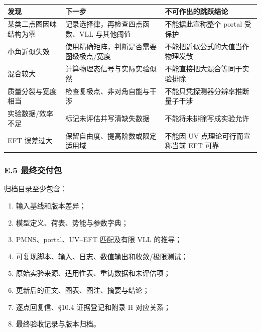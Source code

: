 \documentclass[
  chinese,
  UTF8]{ctexart}
\newcounter{none} %
\providecommand{\tightlist}{%
  \setlength{\itemsep}{0pt}\setlength{\parskip}{0pt}}
\begin{document}
{\def\LTcaptype{none} %
\begin{longtable}[]{@{}
  >{\raggedright\arraybackslash}p{}
  >{\raggedright\arraybackslash}p{}
  >{\raggedright\arraybackslash}p{}@{}}
\toprule\noalign{}
\begin{minipage}[b]{\linewidth}\raggedright
发现
\end{minipage} & \begin{minipage}[b]{\linewidth}\raggedright
下一步
\end{minipage} & \begin{minipage}[b]{\linewidth}\raggedright
不可作出的跳跃结论
\end{minipage} \\
\midrule\noalign{}
\endhead
\bottomrule\noalign{}
\endlastfoot
某类二点图因味结构为零 & 记录选择律，再检查四点函数、VLL 与其他阈值 &
不能据此宣称整个 portal 受保护 \\
小角近似失效 & 使用精确矩阵，判断是否需要圈级极点/宽度 &
不能把近似公式的大值当作物理发散 \\
混合较大 & 计算物理态信号与实际实验似然 &
不能直接把大混合等同于实验排除 \\
质量分裂与宽度相当 & 检查复极点、非对角自能与干涉 &
不能只凭探测器分辨率推断量子干涉 \\
实验数据/效率不足 & 标记未评估并写清缺失数据 &
不能将未排除写成实验允许 \\
EFT 误差过大 & 保留自由度、提高阶数或限定适用域 & 不能因 UV
点理论可行而宣称当前 EFT 可靠 \\
\end{longtable}
}

\subsubsection{E.5 最终交付包}\label{e.5-ux6700ux7ec8ux4ea4ux4ed8ux5305}

归档目录至少包含：

\begin{enumerate}
\def\labelenumi{\arabic{enumi}.}
\tightlist
\item
  输入基线和版本差异；
\item
  模型定义、荷表、势能与参数字典；
\item
  PMNS、portal、UV--EFT 匹配及有限 VLL 的推导；
\item
  可复现脚本、输入、日志、数值输出和收敛/极限测试；
\item
  原始实验来源、适用性表、重铸数据和未评估项；
\item
  更新后的正文、图表、图注、摘要与结论；
\item
  逐点回复信、§10.4 证据登记和附录 H 对应关系；
\item
  最终验收记录与版本归档。
\end{enumerate}
\end{document}
